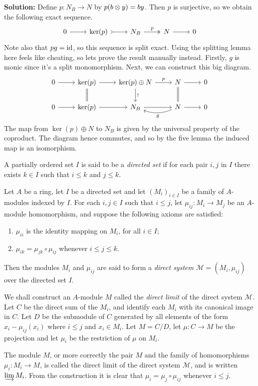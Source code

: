 \documentclass{article}
\begin{document}
\noindent\textbf{Solution:}
Define \(p : N_B \to N\) by \(p(b \otimes y) = by\).
Then \(p\) is surjective, so we obtain the following exact sequence.
\[
    \begin{tikzcd}
        0 \arrow[r] & \ker(p) \arrow[r, tail] & N_B \arrow[r, two heads, "p"] & N \arrow[r] & 0
    \end{tikzcd}
\]
Note also that \(pg = \mathrm{id}\), so this sequence is split exact.
Using the splitting lemma here feels like cheating, so lets prove the result manually instead.
Firstly, \(g\) is monic since it's a split monomorphism.
Next, we can construct this big diagram.
\[
    \begin{tikzcd}
        0 \arrow[r] & \ker(p) \arrow[r] \arrow[d, equal] & \ker(p) \oplus N \arrow[r, "p"] \arrow[d, "!"] & N \arrow[r] \arrow[d, equal] & 0 \\
        0 \arrow[r] & \ker(p) \arrow[r] & N_B \arrow[r] & N \arrow[r] \arrow[l, "g", bend left=20] & 0
    \end{tikzcd}
\]
The map from \(\ker(p) \oplus N\) to \(N_B\) is given by the universal property of the coproduct.
The diagram hence commutes, and so by the five lemma the induced map is an isomorphism.

\begin{exercise} \label{ex2-14}
    A partially ordered set \(I\) is said to be a \textit{directed set} if for each pair \(i, j\) in \(I\) there exists \(k \in I\) such that \(i \leq k\) and \(j \leq k\).

    Let \(A\) be a ring, let \(I\) be a directed set and let \((M_i)_{i \in I}\) be a family of \(A\)-modules indexed by \(I\).
    For each \(i, j \in I\) such that \(i \leq j\), let \(\mu_{ij} : M_i \to M_j\) be an \(A\)-module homomorphism, and suppose the following axioms are satisfied:
    \begin{enumerate}
        \item \label{ex2-14a}
            \(\mu_{ii}\) is the identity mapping on \(M_i\), for all \(i \in I\);
        \item \label{ex2-14b}
            \(\mu_{ik} = \mu_{jk} \circ \mu_{ij}\) whenever \(i \leq j \leq k\).
    \end{enumerate}
    Then the modules \(M_i\) and \(\mu_{ij}\) are said to form a \textit{direct system} \(\mathcal{M} = (M_i, \mu_{ij})\) over the directed set \(I\).

    We shall construct an \(A\)-module \(M\) called the \textit{direct limit} of the direct system \(\mathcal{M}\).
    Let \(C\) be the direct sum of the \(M_i\), and identify each \(M_i\) with its canonical image in \(C\).
    Let \(D\) be the submodule of \(C\) generated by all elements of the form \(x_i - \mu_{ij}(x_i)\) where \(i \leq j\) and \(x_i \in M_i\).
    Let \(M = C/D\), let \(\mu : C \to M\) be the projection and let \(\mu_i\) be the restriction of \(\mu\) on \(M_i\).

    The module \(M\), or more correctly the pair \(M\) and the family of homomorphisms \(\mu_i : M_i \to M\), is called the direct limit of the direct system \(\mathcal{M}\), and is written \(\varinjlim{M_i}\).
    From the construction it is clear that \(\mu_i = \mu_j \circ \mu_{ij}\) whenever \(i \leq j\).
\end{exercise}
\end{document}
